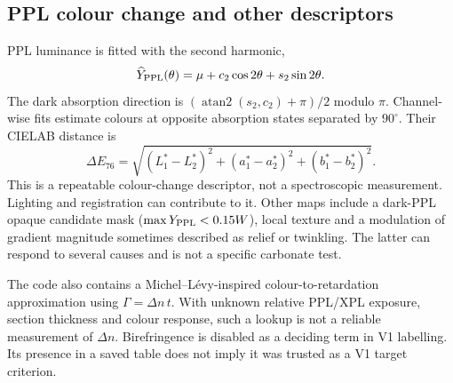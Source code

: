 \subsection{PPL colour change and other descriptors}
PPL luminance is fitted with the second harmonic,
\begin{equation}
\widehat Y_{\rm PPL}(\theta)=\mu+c_2\cos2\theta+s_2\sin2\theta.
\end{equation}
The dark absorption direction is $(\operatorname{atan2}(s_2,c_2)+\pi)/2$ modulo $\pi$. Channel-wise fits estimate colours at opposite absorption states separated by $90^\circ$. Their CIELAB distance is
\begin{equation}
\Delta E_{76}=\sqrt{(L_1^*-L_2^*)^2+(a_1^*-a_2^*)^2+(b_1^*-b_2^*)^2}.
\end{equation}
This is a repeatable colour-change descriptor, not a spectroscopic measurement. Lighting and registration can contribute to it. Other maps include a dark-PPL opaque candidate mask ($\max Y_{\rm PPL}<0.15W$), local texture and a modulation of gradient magnitude sometimes described as relief or twinkling. The latter can respond to several causes and is not a specific carbonate test.

The code also contains a Michel--L\'evy-inspired colour-to-retardation approximation using $\Gamma=\Delta n\,t$. With unknown relative PPL/XPL exposure, section thickness and colour response, such a lookup is not a reliable measurement of $\Delta n$. Birefringence is disabled as a deciding term in V1 labelling. Its presence in a saved table does not imply it was trusted as a V1 target criterion.

\FloatBarrier
